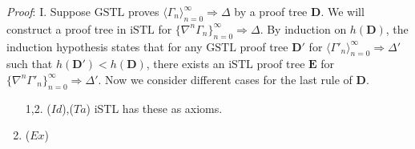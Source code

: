 \emph{Proof}: I. Suppose $\text{GSTL}$ proves $\langle \Gamma_n \rangle_{n=0}^\infty \Rightarrow \Delta$ by a proof tree $\mathbf{D}$. We will construct a proof tree in $\text{iSTL}$ for $\{ \nabla^n \Gamma_n \}_{n=0}^\infty \Rightarrow \Delta$. By induction on $h(\mathbf{D})$, the induction hypothesis states that for any $\text{GSTL}$ proof tree $\mathbf{D}'$ for $\langle \Gamma'_n \rangle_{n=0}^\infty \Rightarrow \Delta'$ such that $h(\mathbf{D}') < h(\mathbf{D})$, there exists an $\text{iSTL}$ proof tree $\mathbf{E}$ for $\{ \nabla^n \Gamma'_n \}_{n=0}^\infty \Rightarrow \Delta'$. Now we consider different cases for the last rule of $\mathbf{D}$.
\begin{enumerate}
	\item[1,2.] ($Id$),($Ta$) iSTL has these as axioms.
	\item ($Ex$)
\end{enumerate}
